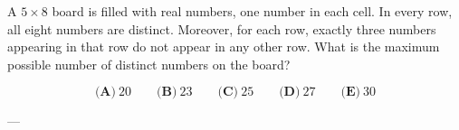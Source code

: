 A \(5\times8\) board is filled with real numbers, one number in each cell. In every row, all eight numbers are distinct. Moreover, for each row, exactly three numbers appearing in that row do not appear in any other row. What is the maximum possible number of distinct numbers on the board?



\[
\textbf{(A)}\ 20
\qquad
\textbf{(B)}\ 23
\qquad
\textbf{(C)}\ 25
\qquad
\textbf{(D)}\ 27
\qquad
\textbf{(E)}\ 30
\]

---
